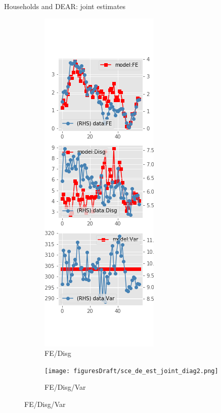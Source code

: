 \documentclass{beamer}
\begin{document}
\begin{frame}{Households and DEAR: joint estimates}
\begin{figure}[ht]
\begin{subfigure}[b]{0.2\textwidth}
		\end{subfigure}
		\hfill
		\begin{subfigure}[b]{0.2\textwidth}
			\caption{FE/Disg}
			\includegraphics[width=\textwidth, height = 0.8\textheight]{figuresDraft/sce_de_est_joint_diag1.png}
		\end{subfigure}
		\hfill
		\begin{subfigure}[b]{0.2\textwidth}
			\caption{FE/Disg/Var}
			\texttt{[image: figuresDraft/sce\_de\_est\_joint\_diag2.png]}
		\end{subfigure}
	\end{figure}
\end{frame}
\end{document}
